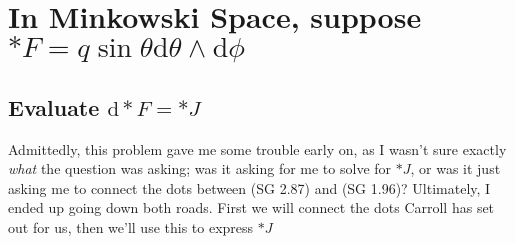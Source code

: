 \section{In Minkowski Space, suppose $ \ast F = q  \sin{\theta}  \textrm{d} \theta  \wedge  \textrm{d} \phi$}


\subsection{Evaluate  $ \textrm{d} \ast F = \ast J $}

Admittedly, this problem gave me some trouble early on, as I wasn't sure exactly \textit{what} the question was asking; was it asking for me to solve for $ \ast J $, or was it just asking me to connect the dots between (SG 2.87) and (SG 1.96)? Ultimately, I ended up going down both roads. First we will connect the dots Carroll has set out for us, then we'll use this to express $ \ast J $ 

